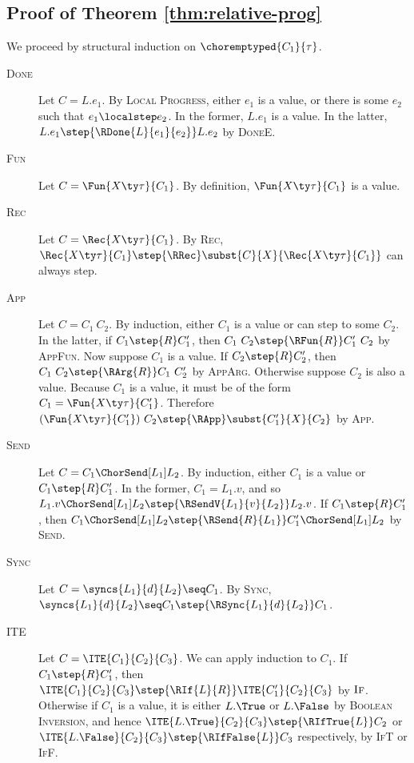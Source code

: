 \subsection{Proof of Theorem \ref{thm:relative-prog}}
We proceed by structural induction on $\choremptyped{C_1}{\tau}$.
\begin{description}
  \item[\textsc{Done}]
  Let $C = L.e_1$.
  By \textsc{Local Progress}, either $e_1$ is a value, or there is some $e_2$ such that $e_1 \localstep e_2$.
  In the former, $L.e_1$ is a value.
  In the latter, $L.e_1 \step{\RDone{L}{e_1}{e_2}} L.e_2$ by \textsc{DoneE}.

  \item[\textsc{Fun}]
  Let $C = \Fun{X \ty \tau}{C_1}$.
  By definition, $\Fun{X \ty \tau}{C_1}$ is a value.

  \item[\textsc{Rec}]
  Let $C = \Rec{X \ty \tau}{C_1}$.
  By \textsc{Rec}, $\Rec{X \ty \tau}{C_1} \step{\RRec} \subst{C}{X}{\Rec{X \ty \tau}{C_1}}$ can always step.

  \item[\textsc{App}]
  Let $C = C_1~C_2$.
  By induction, either $C_1$ is a value or can step to some $C_2$.
  In the latter, if $C_1 \step{R} C_1'$, then $C_1~C_2 \step{\RFun{R}} C_1'~C_2$ by \textsc{AppFun}.
  Now suppose $C_1$ is a value.
  If $C_2 \step{R} C_2'$, then $C_1~C_2 \step{\RArg{R}} C_1~C_2'$ by \textsc{AppArg}.
  Otherwise suppose $C_2$ is also a value.
  Because $C_1$ is a value, it must be of the form $C_1 = \Fun{X \ty \tau}{C_1'}$.
  Therefore $(\Fun{X \ty \tau}{C_1'})~C_2 \step{\RApp} \subst{C_1'}{X}{C_2}$ by \textsc{App}.

  \item[\textsc{Send}]
  Let $C = C_1 \ChorSend[L_1] L_2$.
  By induction, either $C_1$ is a value or $C_1 \step{R} C_1'$.
  In the former, $C_1 = L_1.v$, and so $L_1.v \ChorSend[L_1] L_2 \step{\RSendV{L_1}{v}{L_2}} L_2.v$.
  If $C_1 \step{R} C_1'$, then $C_1 \ChorSend[L_1] L_2 \step{\RSend{R}{L_1}} C_1' \ChorSend[L_1] L_2$ by \textsc{Send}.

  \item[\textsc{Sync}]
  Let $C = \syncs{L_1}{d}{L_2} \seq C_1$.
  By \textsc{Sync}, $\syncs{L_1}{d}{L_2} \seq C_1 \step{\RSync{L_1}{d}{L_2}} C_1$.

  \item[\textsc{ITE}]
  Let $C = \ITE{C_1}{C_2}{C_3}$.
  We can apply induction to $C_1$.
  If $C_1 \step{R} C_1'$, then $\ITE{C_1}{C_2}{C_3} \step{\RIf{L}{R}} \ITE{C_1'}{C_2}{C_3}$ by $\textsc{If}$.
  Otherwise if $C_1$ is a value, it is either $L.\True$ or $L.\False$ by \textsc{Boolean Inversion}, and hence $\ITE{L.\True}{C_2}{C_3} \step{\RIfTrue{L}} C_2$ or $\ITE{L.\False}{C_2}{C_3} \step{\RIfFalse{L}} C_3$ respectively, by \textsc{IfT} or \textsc{IfF}.


\end{description}
